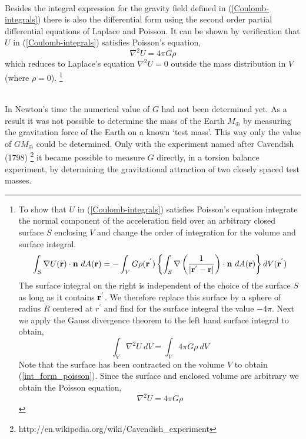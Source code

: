 ~\\
\noindent
Besides the integral expression for the gravity field defined in
(\ref{Coulomb-integrals}) there is also the differential form
using the second order partial differential equations of Laplace and
Poisson.
It can be shown by verification that $U$ in (\ref{Coulomb-integrals})
satisfies Poisson's equation, 
\begin{equation}
\boxed{\nabla^2 U = 4\pi G\rho}  \label{poisson_eqn}
\end{equation}
which reduces to Laplace's equation $\nabla^2 U = 0$
outside the mass distribution in $V$ (where $\rho =0$). 
\footnote{
To show that $U$ in (\ref{Coulomb-integrals}) satisfies Poisson's
equation integrate the normal component of the acceleration field
over an arbitrary closed surface $S$ enclosing $V$
and change the order of integration for the volume and surface
integral.
\begin{equation}
\int_S \nabla U({\bf r}) \cdot {\bf n} \ dA({\bf r})
   = - \int_V G \rho({\bf r}^{'}) 
    \left \{
     \int_S 
       \nabla 
       \left ( \frac{1}{\left | {\bf r}^{'}-{\bf r} \right |} \right )
      \cdot {\bf n} \ dA({\bf r}) 
    \right \} dV({\bf r}^{'})
\label{surface_integral}
\end{equation}
The surface integral on the right is independent of the choice of the
surface $S$ as long as it contains ${\bf r}^{'}$.
We therefore replace this surface by a sphere of radius $R$ centered
at $r^{'}$ and find for the surface integral the value $- 4 \pi$.
\newline
Next we apply the Gauss divergence theorem to the left hand surface 
integral to obtain,
\begin{equation}
\int_V \nabla^2 U \ dV = \int_V 4 \pi G \rho \ dV  
\label{int_form_poisson}
\end{equation}
Note that the surface has been contracted on the volume $V$
to obtain (\ref{int_form_poisson}).
Since the surface and enclosed volume are arbitrary we obtain the Poisson
equation,
\begin{equation}
\nabla^2 U  = 4 \pi G \rho 
\end{equation}
}



~\\
In Newton's time the numerical value of $G$ had not been
determined yet.
As a result it was not possible to determine the mass of the 
Earth $M_{\oplus}$ by measuring the gravitation force of the Earth 
on a known `test mass'.
This way only the value of $G M_{\oplus}$ could be determined.
Only with the experiment named after Cavendish (1798)
\footnote{
http://en.wikipedia.org/wiki/Cavendish\_experiment
}
it became possible
to measure $G$ directly, in a torsion balance experiment,
by determining the gravitational attraction of two closely spaced test 
masses.   

